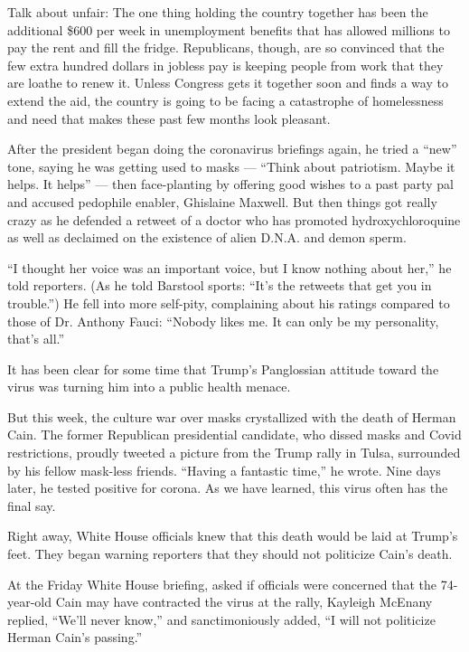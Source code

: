 Talk about unfair: The one thing holding the country together has been
the additional \$600 per week in unemployment benefits that has allowed
millions to pay the rent and fill the fridge. Republicans, though, are
so convinced that the few extra hundred dollars in jobless pay is
keeping people from work that they are loathe to renew it. Unless
Congress gets it together soon and finds a way to extend the aid, the
country is going to be facing a catastrophe of homelessness and need
that makes these past few months look pleasant.

After the president began doing the coronavirus briefings again, he
tried a ``new'' tone, saying he was getting used to masks --- ``Think
about patriotism. Maybe it helps. It helps'' --- then face-planting by
offering good wishes to a past party pal and accused pedophile enabler,
Ghislaine Maxwell. But then things got really crazy as he defended a
retweet of a doctor who has promoted hydroxychloroquine as well as
declaimed on the existence of alien D.N.A. and demon sperm.

``I thought her voice was an important voice, but I know nothing about
her,'' he told reporters. (As he told Barstool sports: ``It's the
retweets that get you in trouble.'') He fell into more self-pity,
complaining about his ratings compared to those of Dr. Anthony Fauci:
``Nobody likes me. It can only be my personality, that's all.''

It has been clear for some time that Trump's Panglossian attitude toward
the virus was turning him into a public health menace.

But this week, the culture war over masks crystallized with the death of
Herman Cain. The former Republican presidential candidate, who dissed
masks and Covid restrictions, proudly tweeted a picture from the Trump
rally in Tulsa, surrounded by his fellow mask-less friends. ``Having a
fantastic time,'' he wrote. Nine days later, he tested positive for
corona. As we have learned, this virus often has the final say.

Right away, White House officials knew that this death would be laid at
Trump's feet. They began warning reporters that they should not
politicize Cain's death.

At the Friday White House briefing, asked if officials were concerned
that the 74-year-old Cain may have contracted the virus at the rally,
Kayleigh McEnany replied, ``We'll never know,'' and sanctimoniously
added, ``I will not politicize Herman Cain's passing.''

